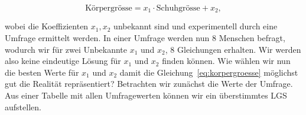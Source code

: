 \begin{figure*}[h]
    \centering
    \begin{minipage}
        {0.5\textwidth}
        \begin{equation}
            \text{Körpergrösse} = x_1\cdot \text{Schuhgrösse} + x_2,
            \label{eq:korpergroesse}
        \end{equation}        
    \end{minipage}
    \hfill
    \begin{minipage}
        {0.45\textwidth}
        \centering
    \end{minipage}
\end{figure*}
    


wobei die Koeffizienten \( x_1, x_2\) unbekannt sind und experimentell durch eine Umfrage ermittelt werden. In einer Umfrage werden nun 8 Menschen befragt, wodurch wir für zwei Unbekannte \( x_1\) und \( x_2\), 8 Gleichungen erhalten. Wir werden also keine eindeutige Lösung für \( x_1\) und \( x_2\) finden können. Wie wählen wir nun die besten Werte für \( x_1\) und \( x_2\) damit die Gleichung~\eqref{eq:korpergroesse} möglichst gut die Realität repräsentiert? Betrachten wir zunächst die Werte der Umfrage. Aus einer Tabelle mit allen Umfragewerten können wir ein überstimmtes LGS aufstellen. 

\vspace{1\baselineskip}

